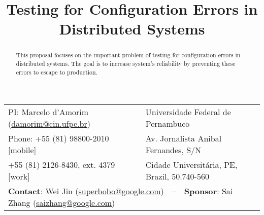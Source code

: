 \documentclass[11pt]{article}
\begin{document}
\title{\LARGE{}Testing for Configuration Errors in Distributed Systems}
\author{}
\date{}


\makeatletter
\def\maketitle{%
  \par{\centering\large\textbf{\@title}\normalsize\par}\vspace{3ex}%
  \par{\@author}%
  \par}
\makeatother

\maketitle

\vspace{-2ex}
\small
\begin{table}[h!]
  \centering%
  \begin{tabular*}{.85\linewidth}{@{\extracolsep{\fill}}ll}
    PI: Marcelo d'Amorim (\url{damorim@cin.ufpe.br}) & Universidade Federal de Pernambuco \\
    Phone: +55 (81) 98800-2010 [mobile]  & Av. Jornalista Anibal Fernandes, S/N \\
    \phantom{x}\hspace{7ex}+55 (81) 2126-8430, ext. 4379 [work] & Cidade Universit\'aria, PE, Brazil, 50.740-560\\
    \multicolumn{2}{l}{\noindent\textbf{Contact}: Wei Jin
      (\url{superbobo@google.com})~~--~~\textbf{Sponsor}: Sai Zhang (\url{saizhang@google.com})}\\
  \end{tabular*}
\end{table}
\normalsize

\vspace{-2ex}
\begin{abstract}
This proposal focuses on the important problem of testing for
configuration errors in distributed systems. The goal is to increase
system's reliability by preventing these errors to escape to
production.
\end{abstract}
\end{document}
